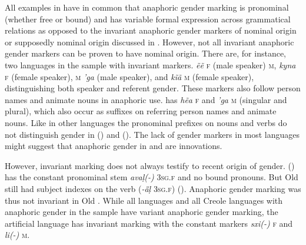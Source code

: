 \documentclass[output=collectionpaper]{langsci/langscibook}
\begin{document}
All examples in  have in common that anaphoric gender marking is pronominal (whether free or bound) and has variable formal expression across grammatical relations as opposed to the invariant anaphoric gender markers of nominal origin or supposedly nominal origin discussed in . However, not all invariant anaphoric gender markers can be proven to have nominal origin. There are, for instance, two  languages in the sample with invariant markers.  \textit{ẽẽ} \textsc{f} (male speaker) \textsc{m}, \textit{kyna} \textsc{f} (female speaker), \textsc{m} \textit{'ga} (male speaker), and \textit{kĩã} \textsc{m} (female speaker), distinguishing both speaker and referent gender. These markers also follow person names and animate nouns in anaphoric use.  has \textit{hẽa} \textsc{f} and \textit{'ga} \textsc{m} (singular and plural), which also occur as suffixes on referring person names and animate nouns. Like in other  languages the pronominal prefixes on nouns and verbs do not distinguish gender in  (\citealt[27]{Dobson2005}) and  (\citealt[17]{Betts1981}). The lack of gender markers in most  languages might suggest that anaphoric gender in  and  are innovations.

However, invariant marking does not always testify to recent origin of gender.  () has the constant pronominal stem \textit{avaḷ(-)} \textsc{3sg.f} and no bound pronouns. But Old  still had subject indexes on the verb (\textit{-ǟḷ} \textsc{3sg.f}) (\citealt[120]{Andronov1996}). Anaphoric gender marking was thus not invariant in Old . While all  languages and all Creole languages with anaphoric gender in the sample have variant anaphoric gender marking, the artificial language  has invariant marking with the constant markers \textit{sxi(-)} \textsc{f} and \textit{li(-)} \textsc{m}.
\end{document}
